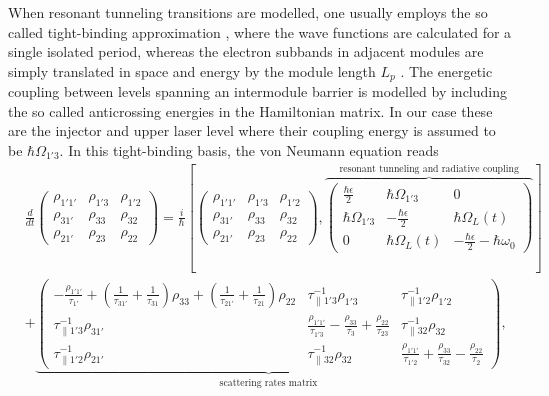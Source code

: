 \documentclass[10pt,letterpaper]{article}
\begin{document}
When resonant tunneling transitions are modelled, one usually employs the so called tight-binding approximation \cite{bastardwave}, where the wave functions are calculated for a single isolated period, whereas the electron subbands in adjacent modules are simply translated in space and energy by the module length $L_p$ \cite{callebaut2005importance}. The energetic coupling between levels spanning an intermodule barrier is modelled by including the so called anticrossing energies in the Hamiltonian matrix. In our case these are the injector and upper laser level where their coupling energy is assumed to be $\hbar \Omega_{1'3}$. In this tight-binding basis, the von Neumann equation reads
\begin{align}
\label{eq:vonNeumannmatrix}
& \frac{d}{dt} \begin{pmatrix}
\rho_{1'1'}& \rho_{1'3} & \rho_{1'2} \\
\rho_{31'} & \rho_{33} & \rho_{32} \\ 
\rho_{21'} & \rho_{23} & \rho_{22}
\end{pmatrix}  =   \frac{i}{\hbar}\left [
\begin{pmatrix}
\rho_{1'1'}& \rho_{1'3} & \rho_{1'2} \\
\rho_{31'} & \rho_{33} & \rho_{32} \\ 
\rho_{21'} & \rho_{23} & \rho_{22}
\end{pmatrix} , 
\overbrace{\begin{pmatrix} 
\frac{\hbar \epsilon}{2} & \hbar\Omega_{1'3} & 0 \\
\hbar\Omega_{1'3}  & -\frac{\hbar	\epsilon}{2} &  \hbar\Omega_{L}(t) \\
0  &\hbar\Omega_{L}(t) & -\frac{\hbar \epsilon}{2}-\hbar\omega_{0}   
\end{pmatrix} }^{\text{resonant tunneling and radiative coupling}}
\right ]  \nonumber \\
& + 
\underbrace{\begin{pmatrix}
-\frac{\rho_{1'1'}}{\tau_{1'}} + (\frac{1}{\tau_{31'}}+\frac{1}{\tau_{31}})\rho_{33}  +  (\frac{1}{\tau_{21'}}+\frac{1}{\tau_{21}})\rho_{22} & \tau_{\parallel 1'3}^{-1}\rho_{1'3} & \tau_{\parallel 1'2}^{-1}\rho_{1'2}\\
\tau_{\parallel 1'3}^{-1}\rho_{31'} & \frac{\rho_{1'1'}}{\tau_{1'3}}   - \frac{\rho_{33}}{\tau_{3}} +  \frac{\rho_{22}}{\tau_{23}} &  \tau_{\parallel 32}^{-1}\rho_{32}\\
\tau_{\parallel 1'2}^{-1}\rho_{21'}& \tau_{\parallel 32}^{-1}\rho_{32} &	\frac{ \rho_{1'1'}}{\tau_{1'2}} + \frac{\rho_{33} }{\tau_{32}} 	- \frac{\rho_{22}}{\tau_2}
\end{pmatrix}}_{\text{scattering rates matrix}},
\end{align}
\end{document}
